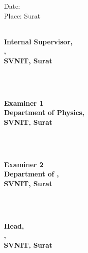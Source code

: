 \vspace{10pt}
\begin{flushleft}
    Date: \ExamDate{}\\
    Place: Surat
\end{flushleft}
\normalsize

\vspace{100pt}
\begin{minipage}{0.4\textwidth}
    \begin{center}
        \textbf{\InternalSupervisor{}\\
        Internal Supervisor,\\
        \InternalSupervisorDept{},\\
        SVNIT, Surat
        }    
    \end{center}   
\end{minipage}\begin{minipage}{0.19\textwidth}
    ~
\end{minipage}\begin{minipage}{0.4\textwidth}
    \begin{center}
        \textbf{\ExaminerOne{}\\
        Examiner 1\\
        Department of Physics, \\
        SVNIT, Surat}
    \end{center}
\end{minipage}
\vspace{100pt}\\
\begin{minipage}{0.4\textwidth}
    \begin{center}
        \textbf{\ExaminerTwo{}\\
        Examiner 2\\
        Department of \Subject{},\\
        SVNIT, Surat}
    \end{center}     
\end{minipage}\begin{minipage}{0.19\textwidth}
    ~
\end{minipage}\begin{minipage}{0.4\textwidth}
    \begin{center}
        \textbf{\Hod{}\\
        Head,\\
        \InternalSupervisorDept{},\\
        SVNIT, Surat
        }    
    \end{center}   
\end{minipage}




